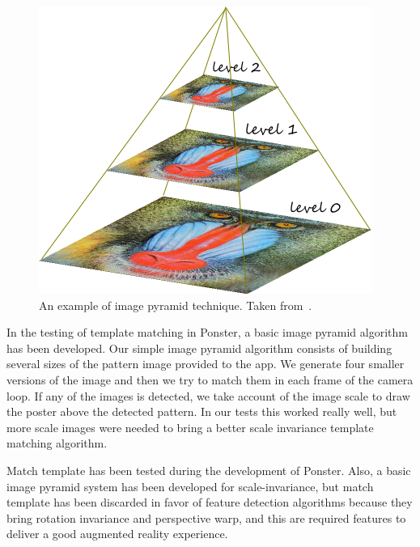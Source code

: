 \begin{figure}
\centering
\includegraphics[scale=0.65]{img/pyramid.png}
\caption{\label{fig:pyramid}An example of image pyramid technique. Taken
  from~\cite{imgpyramid}.} 
\end{figure} 

In the testing of template matching in Ponster, a basic image pyramid algorithm
has been developed. Our simple image pyramid algorithm consists of building
several sizes of the pattern image provided to the app. We generate four
smaller versions of the image and then we try to match them in each frame of
the camera loop. If any of the images is detected, we take account of the
image scale to draw the poster above the detected pattern. In our tests this
worked really well, but more scale images were needed to bring a better scale
invariance template matching algorithm.

Match template has been tested during the development of Ponster. Also, a basic
image pyramid system has been developed for scale-invariance, but match template has
been discarded in favor of feature detection algorithms because they bring rotation
 invariance and perspective warp, and this are required features to deliver a
 good augmented reality experience.


